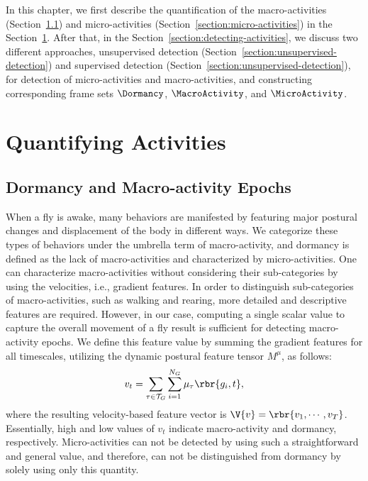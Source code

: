 In this chapter, we first describe the quantification of the macro-activities (Section~\ref{section:dormancy-and-macroactivity}) and micro-activities (Section~\ref{section:micro-activities}) in the Section~\ref{section:quantifying-activities}.
After that, in the Section~\ref{section:detecting-activities}, we discuss two different approaches, unsupervised detection (Section~\ref{section:unsupervised-detection}) and supervised detection (Section~\ref{section:unsupervised-detection}), for detection of micro-activities and macro-activities, and constructing corresponding frame sets $\Dormancy$, $\MacroActivity$, and $\MicroActivity$.

\section{Quantifying Activities}\label{section:quantifying-activities} \subsection{Dormancy and Macro-activity Epochs}\label{section:dormancy-and-macroactivity}
When a fly is awake, many behaviors are manifested by featuring major postural changes and displacement of the body in different ways.
We categorize these types of behaviors under the umbrella term of macro-activity, and dormancy is defined as the lack of macro-activities and characterized by micro-activities.
One can characterize macro-activities without considering their sub-categories by using the velocities, i.e., gradient features.
In order to distinguish sub-categories of macro-activities, such as walking and rearing, more detailed and descriptive features are required.
However, in our case, computing a single scalar value to capture the overall movement of a fly result is  sufficient  for detecting macro-activity epochs. We define this feature value by summing the gradient features for all timescales, utilizing the dynamic postural feature tensor $M^\mu$, as follows:
\begin{equation}\label{equation:displacement}
	v_t = \sum_{\tau \in \mathcal{T}_G}{\sum_{i=1}^{N_G}{\mu_\tau\rbr{g_i,t}}},
\end{equation}
where the resulting velocity-based feature vector is $\V{v}=\rbr{v_1, \cdots, v_T}$. Essentially, high and low values of $v_t$ indicate macro-activity and dormancy, respectively. Micro-activities can not be detected by using such a straightforward and general value, and therefore, can not be distinguished from dormancy by solely using only this quantity.

